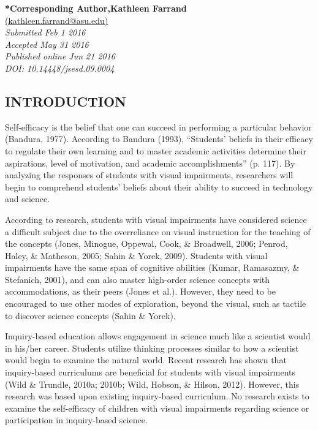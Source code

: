 \documentclass[11.5pt]{sig-alternate} %
\begin{document}
\textbf{*Corresponding Author,Kathleen Farrand }\\
\href{mailto:  kathleen.farrand@asu.edu}{(kathleen.farrand@asu.edu)} \\
\textit{Submitted Feb 1 2016 }\\
\textit{Accepted May 31 2016} \\
\textit{Published online Jun 21 2016} \\
\textit{DOI: 10.14448/jsesd.09.0004} \\
\pagebreak
\clearpage
\begin{large}
   
\section*{INTRODUCTION}

Self-efficacy is the belief that one can succeed in performing a particular behavior (Bandura, 1977). According to Bandura (1993), “Students’ beliefs in their efficacy to regulate their own learning and to master academic activities determine their aspirations, level of motivation, and academic accomplishments” (p. 117). By analyzing the responses of students with visual impairments, researchers will begin to comprehend students’ beliefs about their ability to succeed in technology and science.  

According to research, students with visual impairments have considered science a difficult subject due to the overreliance on visual instruction for the teaching of the concepts (Jones, Minogue, Oppewal, Cook, \& Broadwell, 2006; Penrod, Haley, \& Matheson, 2005; Sahin \& Yorek, 2009). Students with visual impairments have the same span of cognitive abilities (Kumar, Ramasazmy, \& Stefanich, 2001), and can also master high-order science concepts with accommodations, as their peers (Jones et al.). However, they need to be encouraged to use other modes of exploration, beyond the visual, such as tactile to discover science concepts (Sahin \& Yorek).   

Inquiry-based education allows engagement in science much like a scientist would in his/her career. Students utilize thinking processes similar to how a scientist would begin to examine the natural world. Recent research has shown that inquiry-based curriculums are beneficial for students with visual impairments (Wild \& Trundle, 2010a; 2010b; Wild, Hobson, \& Hilson, 2012). However, this research was based upon existing inquiry-based curriculum. No research exists to examine the self-efficacy of children with visual impairments regarding science or participation in inquiry-based science.   


\end{large}
\end{document}
